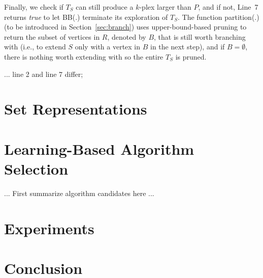 \documentclass[sigconf,anonymous,review]{acmart}
\begin{document}
Finally, we check if $T_{S}$ can still produce a $k$-plex larger than $P$, and if not, Line~7 returns {\em true} to let BB(.) terminate its exploration of $T_S$. The function partition(.) (to be introduced in Section~\ref{sec:branch}) uses upper-bound-based pruning to return the subset of vertices in $R$, denoted by $B$, that is still worth branching with (i.e., to extend $S$ only with a vertex in $B$ in the next step), and if $B=\emptyset$, there is nothing worth extending with so the entire $T_S$ is pruned.

... line 2 and line 7 differ;


\vspace{-1mm}
\section{Set Representations}\label{sec:set}

\vspace{-1mm}
\section{Learning-Based Algorithm Selection}\label{sec:learn}

... First summarize algorithm candidates here ...

\vspace{-1mm}
\section{Experiments}\label{sec:results}

\vspace{-1mm}
\section{Conclusion}\label{sec:conclude}



\end{document}
